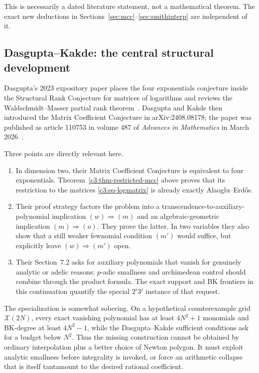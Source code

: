 \documentclass[11pt,oneside]{article}
\theoremstyle{definition}
\theoremstyle{remark}
\begin{document}
This is necessarily a dated literature statement, not a mathematical theorem.  The exact
new deductions in Sections~\ref{sec:mcc}--\ref{sec:smithinterp} are independent of it.

\subsection{Dasgupta--Kakde: the central structural development}

Dasgupta's 2023 expository paper places the four exponentials conjecture inside the
Structural Rank Conjecture for matrices of logarithms and reviews the Waldschmidt--Masser
partial rank theorem~\cite{Dasgupta2023}.  Dasgupta and Kakde then introduced the Matrix
Coefficient Conjecture in arXiv:2408.08178; the paper was published as article 110753 in
volume 487 of \emph{Advances in Mathematics} in March 2026~\cite{DasguptaKakde2026}.

Three points are directly relevant here.
\begin{enumerate}
\item In dimension two, their Matrix Coefficient Conjecture is equivalent to four
      exponentials.  Theorem~\ref{c3:thm-restricted-mcc} above proves that its restriction to
      the matrices \eqref{c3:eq-logmatrix} is already exactly Alaoglu--Erd\H{o}s.
\item Their proof strategy factors the problem into a transcendence-to-auxiliary-polynomial
      implication $(w)\Rightarrow(m)$ and an algebraic-geometric implication
      $(m)\Rightarrow(o)$.  They prove the latter.  In two variables they also show that a
      still weaker fewnomial condition $(m')$ would suffice, but explicitly leave
      $(w)\Rightarrow(m')$ open.
\item Their Section~7.2 asks for auxiliary polynomials that vanish for genuinely analytic or
      adelic reasons: $p$-adic smallness and archimedean control should combine through the
      product formula.  The exact support and BK frontiers in this continuation quantify the
      special $2^i3^j$ instance of that request.
\end{enumerate}

The specialization is somewhat sobering.  On a hypothetical counterexample grid
$\mathcal X(2N)$, every exact vanishing polynomial has at least $4N^2+1$ monomials and
BK-degree at least $4N^2-1$, while the Dasgupta--Kakde sufficient conditions ask for a budget
below $N^2$.  Thus the missing construction cannot be obtained by ordinary interpolation plus
a better choice of Newton polygon.  It must exploit analytic smallness before integrality is
invoked, or force an arithmetic collapse that is itself tantamount to the desired rational
coefficient.
\end{document}
